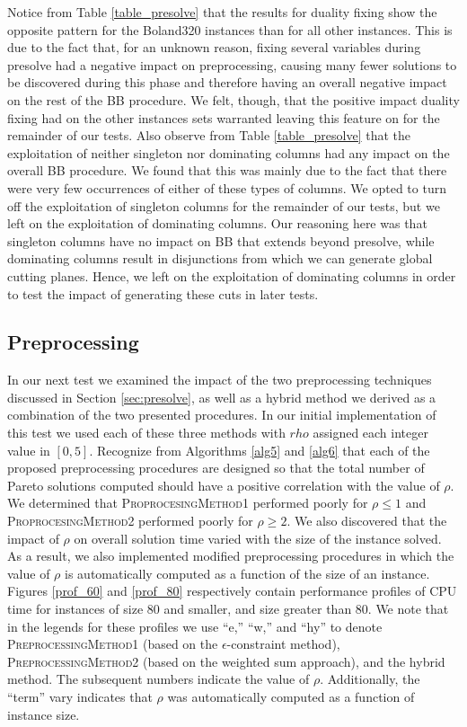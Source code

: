 \documentclass[11.5pt]{article}
\begin{document}
Notice from Table \ref{table_presolve} that the results for duality fixing show the opposite pattern for the Boland320 instances than for all other instances. This is due to the fact that, for an unknown reason, fixing several variables during presolve had a negative impact on preprocessing, causing many fewer solutions to be discovered during this phase and therefore having an overall negative impact on the rest of the BB procedure. We felt, though, that the positive impact duality fixing had on the other instances sets warranted leaving this feature on for the remainder of our tests. Also observe from  Table \ref{table_presolve} that the exploitation of neither singleton nor dominating columns had any impact on the overall BB procedure. We found that this was mainly due to the fact that there were very few occurrences of either of these types of columns. We opted to turn off the exploitation of singleton columns for the remainder of our tests, but we left on the exploitation of dominating columns. Our reasoning here was that singleton columns have no impact on BB that extends beyond presolve, while dominating columns result in disjunctions from which we can generate global cutting planes. Hence, we left on the exploitation of dominating columns in order to test the impact of generating these cuts in later tests. 

\subsection{Preprocessing}\label{preprocess_test}

In our next test we examined the impact of the two preprocessing techniques discussed in Section \ref{sec:presolve}, as well as a hybrid method we derived as a combination of the two presented procedures.  In our initial implementation of this test we used each of these three methods with $rho$ assigned each integer value in $[0,5]$. Recognize from Algorithms \ref{alg5} and \ref{alg6} that each of the proposed preprocessing procedures are designed so that the total number of Pareto solutions computed should have a positive correlation with the value of $\rho$. We determined that \textsc{ProprocesingMethod1} performed poorly for $\rho \leq 1$ and \textsc{ProprocesingMethod2} performed poorly for $\rho \geq 2$. We also discovered that the impact of $\rho$ on overall solution time varied with the size of the instance solved. As a result, we also implemented modified preprocessing procedures in which the value of $\rho$ is automatically computed as a function of the size of an instance. Figures \ref{prof_60} and \ref{prof_80} respectively contain performance profiles of CPU time for instances of size 80 and smaller, and size greater than 80. We note that in the legends for these profiles we use ``e,'' ``w,'' and ``hy'' to denote \textsc{PreprocessingMethod1} (based on the $\epsilon$-constraint method), \textsc{PreprocessingMethod2} (based on the weighted sum approach), and the hybrid method. The subsequent numbers indicate the value of $\rho$. Additionally, the ``term'' vary indicates that $\rho$ was automatically computed as a function of instance size.
\end{document}
